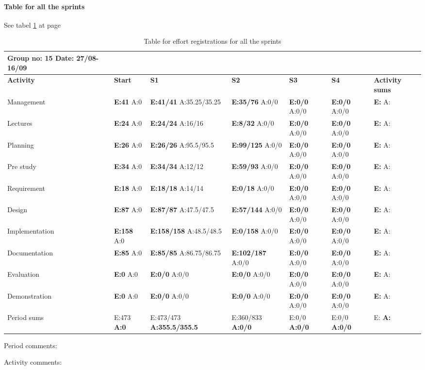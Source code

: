 \paragraph{Table for all the sprints}\hfill

See tabel \ref{tab:effortsprints} at page \pageref{tab:effortsprints}
\begin{table}
\begin{tabularx}{\linewidth}{>{\setlength\hsize{.55\hsize}}X|>{\setlength\hsize{0.2\hsize}}X|>{\setlength\hsize{0.4\hsize}}X|>{\setlength\hsize{0.3\hsize}}X|>{\setlength\hsize{0.3\hsize}}X|>{\setlength\hsize{.3\hsize}}X|>{\setlength\hsize{.2\hsize}}X}
Group no: 15 Date: 27/08-16/09 \\ \hline
\textbf{Activity} & \textbf{Start} & \textbf{S1} & \textbf{S2} & \textbf{S3} & \textbf{S4} & \textbf{Activity sums}\\ \hline \hline
Management & \textbf{E:41} A:0 & \textbf{E:41/41} A:35.25/35.25 & \textbf{E:35/76} A:0/0 & \textbf{E:0/0} A:0/0 & \textbf{E:0/0} A:0/0 & \textbf{E: } A:  \\ \hline
Lectures & \textbf{E:24} A:0 & \textbf{E:24/24} A:16/16 & \textbf{E:8/32} A:0/0 & \textbf{E:0/0} A:0/0 & \textbf{E:0/0} A:0/0 & \textbf{E: } A:  \\ \hline
Planning & \textbf{E:26} A:0 & \textbf{E:26/26} A:95.5/95.5 & \textbf{E:99/125} A:0/0 & \textbf{E:0/0} A:0/0 & \textbf{E:0/0} A:0/0  & \textbf{E: } A:  \\ \hline
Pre study & \textbf{E:34} A:0 & \textbf{E:34/34} A:12/12 & \textbf{E:59/93} A:0/0 & \textbf{E:0/0} A:0/0 & \textbf{E:0/0} A:0/0 & \textbf{E: } A:  \\ \hline
Requirement & \textbf{E:18} A:0 & \textbf{E:18/18} A:14/14 & \textbf{E:0/18} A:0/0 & \textbf{E:0/0} A:0/0 & \textbf{E:0/0} A:0/0 & \textbf{E: } A:  \\ \hline
Design & \textbf{E:87} A:0 & \textbf{E:87/87} A:47.5/47.5 & \textbf{E:57/144} A:0/0 & \textbf{E:0/0} A:0/0 & \textbf{E:0/0} A:0/0 & \textbf{E: } A:  \\ \hline
Implementation & \textbf{E:158} A:0 & \textbf{E:158/158} A:48.5/48.5 & \textbf{E:0/158} A:0/0 & \textbf{E:0/0} A:0/0 & \textbf{E:0/0} A:0/0 & \textbf{E: } A:  \\ \hline
Documentation & \textbf{E:85} A:0 & \textbf{E:85/85} A:86.75/86.75 & \textbf{E:102/187} A:0/0 & \textbf{E:0/0} A:0/0 & \textbf{E:0/0} A:0/0 & \textbf{E: } A:  \\ \hline
Evaluation & \textbf{E:0} A:0 & \textbf{E:0/0} A:0/0 & \textbf{E:0/0} A:0/0 & \textbf{E:0/0} A:0/0 & \textbf{E:0/0} A:0/0 & \textbf{E: } A:  \\ \hline
Demonstration & \textbf{E:0} A:0 & \textbf{E:0/0} A:0/0 & \textbf{E:0/0} A:0/0 & \textbf{E:0/0} A:0/0 & \textbf{E:0/0} A:0/0 & \textbf{E: } A:  \\ \hline
Period sums & E:473 \textbf{A:0} & E:473/473 \textbf{A:355.5/355.5} & E:360/833 \textbf{A:0/0} & E:0/0 \textbf{A:0/0} & E:0/0 \textbf{A:0/0} & E: \textbf{A:}  
\end{tabularx}

Period comments:

Activity comments:
\caption{Table for effort registrations for all the sprints} \label{tab:effortsprints}
\end{table}


